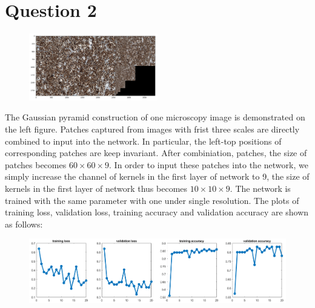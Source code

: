 \documentclass[UTF8]{article}
\begin{document}
\section*{Question 2}
\begin{figure}
  \includegraphics[width=0.5\textwidth]{../imgs/pymid.png}
    \label{fig1}
\end{figure}
The Gaussian pyramid construction of one microscopy image is demonstrated on the left figure.
%
Patches captured from images with frist three scales are directly combined to input into the network.
%
In particular,
the left-top positions of corresponding patches are keep invariant.
%
After combiniation, patches,
the size of patches becomes $60 \times 60 \times 9$.
%
In order to input these patches into the network,
we simply increase the channel of kernels in the first layer of network to 9,
the size of kernels in the first layer of network thus becomes $10 \times 10 \times 9$.
%
The network is trained with the same parameter with one under single resolution.
%
The plots of training loss, validation loss, training accuracy and validation accuracy
are shown as follows:
\begin{figure}[htbp]	%
\centering
\includegraphics[width=\textwidth]{../imgs/mulloss.png}
\label{fig_bay}
\end{figure}
\end{document}
